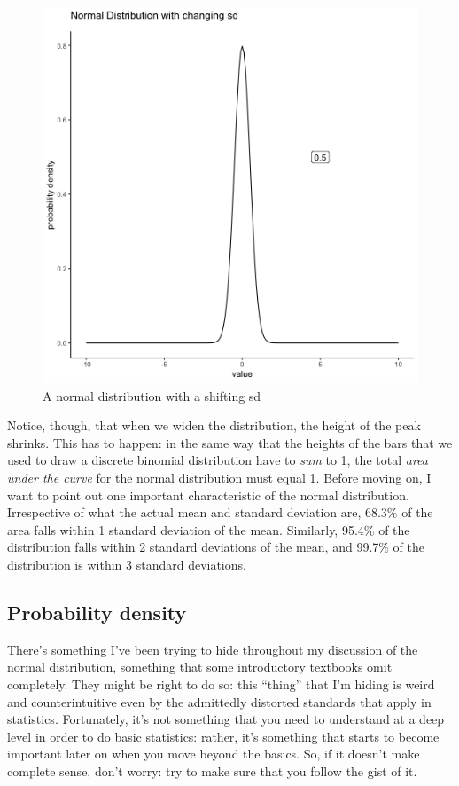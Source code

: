 \documentclass[
]{book}
\begin{document}
\begin{figure}
\centering
\includegraphics{gifs/normalMovingSD-1.gif}
\caption{\label{fig:4normalSDShift}A normal distribution with a shifting sd}
\end{figure}

Notice, though, that when we widen the distribution, the height of the peak shrinks. This has to happen: in the same way that the heights of the bars that we used to draw a discrete binomial distribution have to \emph{sum} to 1, the total \emph{area under the curve} for the normal distribution must equal 1. Before moving on, I want to point out one important characteristic of the normal distribution. Irrespective of what the actual mean and standard deviation are, 68.3\% of the area falls within 1 standard deviation of the mean. Similarly, 95.4\% of the distribution falls within 2 standard deviations of the mean, and 99.7\% of the distribution is within 3 standard deviations.

\hypertarget{probability-density}{%
\subsection{Probability density}\label{probability-density}}

There's something I've been trying to hide throughout my discussion of the normal distribution, something that some introductory textbooks omit completely. They might be right to do so: this ``thing'' that I'm hiding is weird and counterintuitive even by the admittedly distorted standards that apply in statistics. Fortunately, it's not something that you need to understand at a deep level in order to do basic statistics: rather, it's something that starts to become important later on when you move beyond the basics. So, if it doesn't make complete sense, don't worry: try to make sure that you follow the gist of it.
\end{document}
